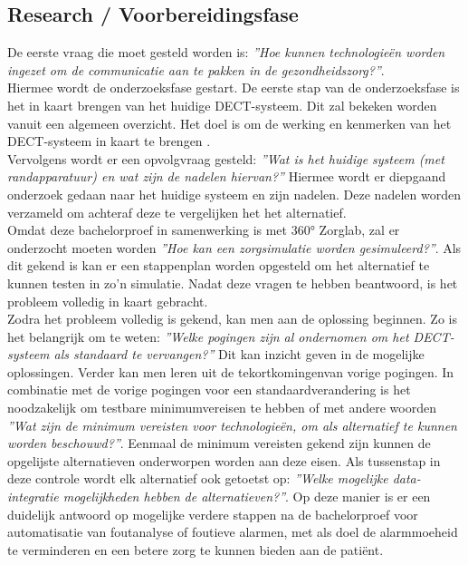 \subsection{Research / Voorbereidingsfase}
De eerste vraag die moet gesteld worden is: \textit{''Hoe kunnen technologieën worden ingezet om de communicatie aan te pakken in de gezondheidszorg?''}.\\ 

Hiermee wordt de onderzoeksfase gestart. De eerste stap van de onderzoeksfase is het in kaart brengen van het huidige DECT-systeem. Dit zal bekeken worden vanuit een algemeen overzicht. Het doel is om de werking en kenmerken van het DECT-systeem in kaart te brengen .\\
Vervolgens wordt er een opvolgvraag gesteld: \textit{''Wat is het huidige systeem (met randapparatuur) en wat zijn de nadelen hiervan?''} Hiermee wordt er diepgaand onderzoek gedaan naar het huidige systeem en zijn nadelen. Deze nadelen worden verzameld om achteraf deze te vergelijken het het alternatief.\\ Omdat deze bachelorproef in samenwerking is met 360° Zorglab, zal er onderzocht moeten worden \textit{''Hoe kan een zorgsimulatie worden gesimuleerd?''}. Als dit gekend is kan er een stappenplan worden opgesteld om het alternatief te kunnen testen in zo'n simulatie.
Nadat deze vragen te hebben beantwoord, is het probleem volledig in kaart gebracht.\\



Zodra het probleem volledig is gekend, kan men aan de oplossing beginnen. Zo is het belangrijk om te weten: \textit{''Welke pogingen zijn al ondernomen om het DECT-systeem als standaard te vervangen?''} Dit kan inzicht geven in de mogelijke oplossingen. Verder kan men leren uit de tekortkomingenvan vorige pogingen. In combinatie met de vorige pogingen voor een standaardverandering is het noodzakelijk om testbare minimumvereisen te hebben of met andere woorden \textit{''Wat zijn de minimum vereisten voor technologieën, om als alternatief te kunnen worden beschouwd?''}. 
Eenmaal de minimum vereisten gekend zijn kunnen de opgelijste alternatieven onderworpen worden aan deze eisen. Als tussenstap in deze controle wordt elk alternatief ook getoetst op: \textit{''Welke mogelijke data-integratie mogelijkheden hebben de alternatieven?''}. Op deze manier is er een duidelijk antwoord op mogelijke verdere stappen na de bachelorproef voor automatisatie van foutanalyse of foutieve alarmen, met als doel de alarmmoeheid te verminderen en een betere zorg te kunnen bieden aan de patiënt.


